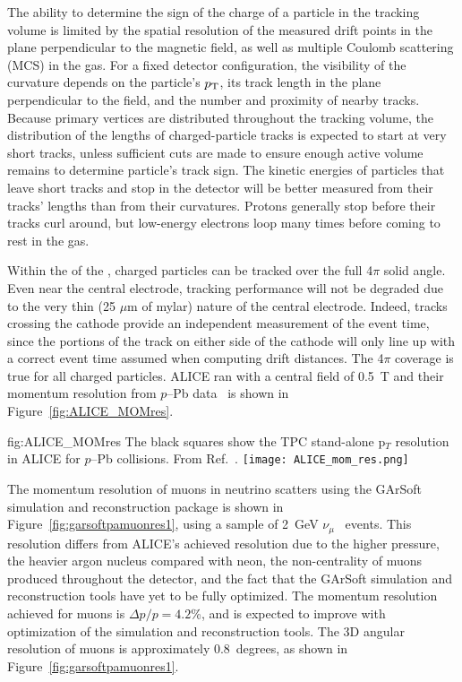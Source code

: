 %
The ability to determine the sign of the charge of a particle in the  tracking volume is limited by the spatial resolution of the measured drift points in the plane perpendicular to the magnetic field, as well as multiple Coulomb scattering (MCS) in the gas. For a fixed detector configuration, the visibility of the curvature depends on the particle's $p_{\rm{T}}$, its track length in the plane perpendicular to the field, and the number and proximity of nearby tracks.  Because primary vertices are distributed throughout the tracking volume, the distribution of the lengths of charged-particle tracks is expected to start at very short tracks, unless sufficient  cuts are made to ensure enough active volume remains to determine particle's track sign.  The kinetic energies of particles that leave short tracks and stop in the detector will be better measured from their tracks' lengths than from their curvatures.  Protons generally stop before their tracks curl around, but low-energy electrons loop many times before coming to rest in the gas.

Within the  of the , charged particles can be tracked over the full 4$\pi$ solid angle.  Even near the central electrode, tracking performance will not be degraded due to the very thin (25 $\mu$m of mylar) nature of the central electrode.   Indeed, tracks crossing the cathode provide an independent measurement of the event time, since the portions of the track on either side of the cathode will only line up with a correct event time assumed when computing drift distances. The 4$\pi$ coverage is true for all charged particles.  ALICE ran with a central field of 0.5~T and their momentum resolution from $p$--Pb data~\cite{Abelev:2014ffa} is shown in Figure~\ref{fig:ALICE_MOMres}.



\begin{dunefigure}
{fig:ALICE_MOMres}
{The black squares show the TPC stand-alone p$_T$ resolution in ALICE for $p$--Pb collisions. From Ref.~\cite{Abelev:2014ffa}.}
\texttt{[image: ALICE\_mom\_res.png]}
\end{dunefigure}
%
The momentum resolution of muons in neutrino scatters using the GArSoft simulation and reconstruction package is shown in Figure~\ref{fig:garsoftpamuonres1}, using a sample of 2~GeV $\nu_\mu$~ events.  This resolution differs from ALICE's achieved resolution due to the higher pressure, the heavier argon nucleus compared with neon, the non-centrality of muons produced throughout the detector, and the fact that the GArSoft simulation and reconstruction tools have yet to be fully optimized.  The momentum resolution achieved for muons is $\Delta p/p = 4.2$\%, and is expected to improve with optimization of the simulation and reconstruction tools.  The 3D angular resolution of muons is approximately 0.8~degrees, as shown in Figure~\ref{fig:garsoftpamuonres1}. 


